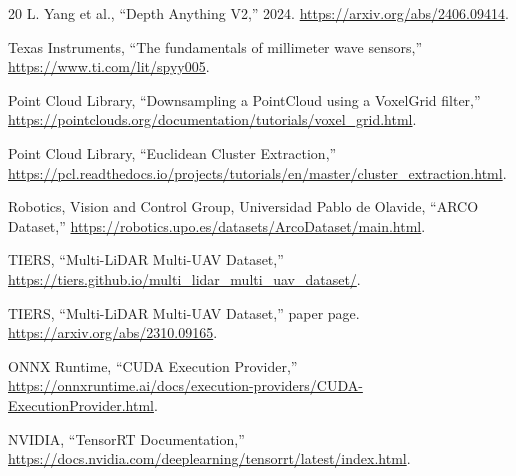 \documentclass[10pt,a4paper]{article}
\begin{document}
{\begin{thebibliography}{20}
L. Yang et al., ``Depth Anything V2,'' 2024. \url{https://arxiv.org/abs/2406.09414}.

Texas Instruments, ``The fundamentals of millimeter wave sensors,'' \url{https://www.ti.com/lit/spyy005}.

Point Cloud Library, ``Downsampling a PointCloud using a VoxelGrid filter,'' \url{https://pointclouds.org/documentation/tutorials/voxel_grid.html}.

Point Cloud Library, ``Euclidean Cluster Extraction,'' \url{https://pcl.readthedocs.io/projects/tutorials/en/master/cluster_extraction.html}.

Robotics, Vision and Control Group, Universidad Pablo de Olavide, ``ARCO Dataset,'' \url{https://robotics.upo.es/datasets/ArcoDataset/main.html}.

TIERS, ``Multi-LiDAR Multi-UAV Dataset,'' \url{https://tiers.github.io/multi_lidar_multi_uav_dataset/}.

TIERS, ``Multi-LiDAR Multi-UAV Dataset,'' paper page. \url{https://arxiv.org/abs/2310.09165}.

ONNX Runtime, ``CUDA Execution Provider,'' \url{https://onnxruntime.ai/docs/execution-providers/CUDA-ExecutionProvider.html}.

NVIDIA, ``TensorRT Documentation,'' \url{https://docs.nvidia.com/deeplearning/tensorrt/latest/index.html}.

\end{thebibliography}
}
\end{document}
